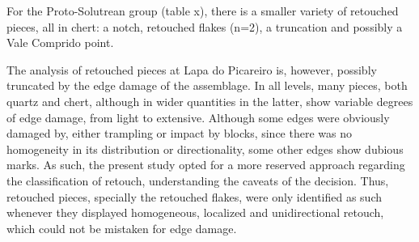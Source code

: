 \documentclass[12pt,twoside]{reedthesis}
\begin{document}
For the Proto-Solutrean group (table x), there is a smaller variety of retouched pieces, all in chert: a notch, retouched flakes (n=2), a truncation and possibly a Vale Comprido point.
\begin{table}[!h]

\caption{\label{tab:retouchTG}Terminal Gravettian retouched piece typology by raw material.}
\centering
{}
\end{table}
\begin{table}[!h]

\caption{\label{tab:retouchPR}Phase 2 Retouched piece typology by raw material.}
\centering
{}
\end{table}
The analysis of retouched pieces at Lapa do Picareiro is, however, possibly truncated by the edge damage of the assemblage. In all levels, many pieces, both quartz and chert, although in wider quantities in the latter, show variable degrees of edge damage, from light to extensive. Although some edges were obviously damaged by, either trampling or impact by blocks, since there was no homogeneity in its distribution or directionality, some other edges show dubious marks. As such, the present study opted for a more reserved approach regarding the classification of retouch, understanding the caveats of the decision. Thus, retouched pieces, specially the retouched flakes, were only identified as such whenever they displayed homogeneous, localized and unidirectional retouch, which could not be mistaken for edge damage.
\end{document}
